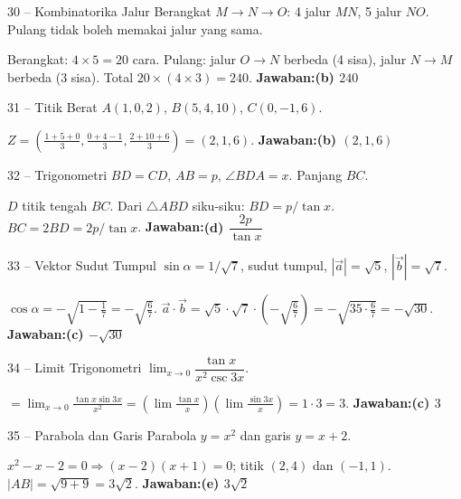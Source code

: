 \documentclass[11pt]{article}
\newcommand{\jawaban}[1]{\textbf{Jawaban:}\enspace\colorbox{gold!30}{\textbf{#1}}}
\begin{document}
\begin{soal}{30 -- Kombinatorika Jalur}
Berangkat $M\to N\to O$: 4 jalur $MN$, 5 jalur $NO$. Pulang tidak boleh memakai jalur yang sama.
\end{soal}
\begin{pembox}
Berangkat: $4\times5=20$ cara. Pulang: jalur $O\to N$ berbeda (4 sisa), jalur $N\to M$ berbeda (3 sisa). Total $20\times(4\times3)=240$.
\jawaban{(b) $240$}
\end{pembox}

\begin{soal}{31 -- Titik Berat}
$A(1,0,2)$, $B(5,4,10)$, $C(0,-1,6)$.
\end{soal}
\begin{pembox}
$Z=\left(\frac{1+5+0}{3},\frac{0+4-1}{3},\frac{2+10+6}{3}\right)=(2,1,6)$.
\jawaban{(b) $(2,1,6)$}
\end{pembox}

\begin{soal}{32 -- Trigonometri}
$BD=CD$, $AB=p$, $\angle BDA=x$. Panjang $BC$.
\end{soal}
\begin{pembox}
$D$ titik tengah $BC$. Dari $\triangle ABD$ siku-siku: $BD=p/\tan x$. $BC=2BD=2p/\tan x$.
\jawaban{(d) $\dfrac{2p}{\tan x}$}
\end{pembox}

\begin{soal}{33 -- Vektor Sudut Tumpul}
$\sin\alpha=1/\sqrt7$, sudut tumpul, $|\vec a|=\sqrt5$, $|\vec b|=\sqrt7$.
\end{soal}
\begin{pembox}
$\cos\alpha=-\sqrt{1-\tfrac17}=-\sqrt{\tfrac67}$. $\vec a\cdot\vec b=\sqrt5\cdot\sqrt7\cdot(-\sqrt{\tfrac67})=-\sqrt{35\cdot\tfrac67}=-\sqrt{30}$.
\jawaban{(c) $-\sqrt{30}$}
\end{pembox}

\begin{soal}{34 -- Limit Trigonometri}
$\displaystyle\lim_{x\to0}\dfrac{\tan x}{x^2\csc3x}$.
\end{soal}
\begin{pembox}
$=\lim_{x\to0}\frac{\tan x\sin3x}{x^2}=\left(\lim\frac{\tan x}{x}\right)\left(\lim\frac{\sin3x}{x}\right)=1\cdot3=3$.
\jawaban{(c) $3$}
\end{pembox}

\begin{soal}{35 -- Parabola dan Garis}
Parabola $y=x^2$ dan garis $y=x+2$.
\end{soal}
\begin{pembox}
$x^2-x-2=0\Rightarrow(x-2)(x+1)=0$; titik $(2,4)$ dan $(-1,1)$.
$|AB|=\sqrt{9+9}=3\sqrt2$.
\jawaban{(e) $3\sqrt2$}
\end{pembox}
\end{document}
